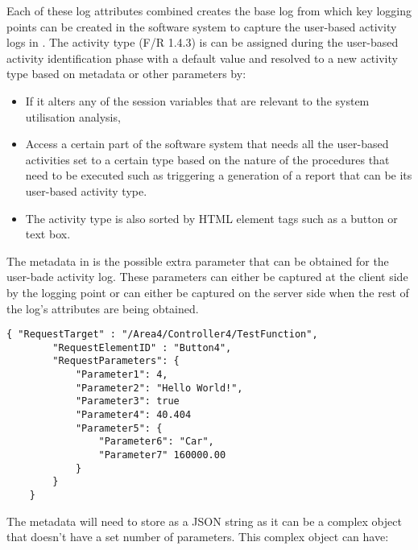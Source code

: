Each of these log attributes combined creates the base log from which key logging points can be created in the software system to capture the user-based activity logs in . The activity type (F/R 1.4.3) is can be assigned during the user-based activity identification phase with a default value and resolved to a new activity type based on metadata or other parameters by:

\begin{itemize}
	\item If it alters any of the session variables that are relevant to the system utilisation analysis,
	\item Access a certain part of the software system that needs all the user-based activities set to a certain type based on the nature of the procedures that need to be executed such as triggering a generation of a report that can be its user-based activity type.
	\item The activity type is also sorted by HTML element tags such as a button or text box.
\end{itemize}

The metadata in  is the possible extra parameter that can be obtained for the user-bade activity log. These parameters can either be captured at the client side by the logging point or can either be captured on the server side when the rest of the log's attributes are being obtained.

\begin{lstlisting}[style=json, caption={\textit{Metadata JSON}}, label={fig:Ch2_Metadata_Json_Example}] 
	{ "RequestTarget" : "/Area4/Controller4/TestFunction",
		"RequestElementID" : "Button4",
		"RequestParameters": {
			"Parameter1": 4,
			"Parameter2": "Hello World!",
			"Parameter3": true
			"Parameter4": 40.404
			"Parameter5": {
				"Parameter6": "Car",
				"Parameter7" 160000.00
			}
		}		
	}
\end{lstlisting}

The metadata will need to store as a JSON string as it can be a complex object that doesn't have a set number of parameters. This complex object can have:

